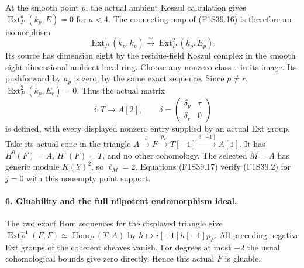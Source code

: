 At the smooth point $p$, the actual ambient
Koszul calculation gives
$\operatorname{Ext}^a_P(k_p,E)=0$ for $a<4$.
The connecting map of (F1S39.16) is therefore
an isomorphism
\[
 \operatorname{Ext}^1_P(k_p,k_p)
       \xrightarrow{\sim}\operatorname{Ext}^2_P(k_p,E_p).
 \tag{F1S39.19}
\]
Its source has dimension eight by the
residue-field Koszul complex in the smooth
eight-dimensional ambient local ring.
Choose any nonzero class $\tau$ in its image.
Its pushforward by $a_p$ is zero, by the same
exact sequence. Since $p\ne r$,
$\operatorname{Ext}^2_P(k_p,E_r)=0$.
Thus the actual matrix
\[
 \delta:T\longrightarrow A[2],\qquad
 \delta=\begin{pmatrix}\delta_p&\tau\\
                         \delta_r&0\end{pmatrix}
 \tag{F1S39.20}
\]
is defined, with every displayed nonzero
entry supplied by an actual Ext group.
Take its actual cone in the triangle
$A\xrightarrow{i}F\xrightarrow{p_F}T[-1]
\xrightarrow{\delta[-1]}A[1]$.
It has $H^0(F)=A$, $H^1(F)=T$, and no
other cohomology. The selected $M=A$
has generic module $K(Y)^2$, so $\ell_M=2$.
Equations (F1S39.17) verify (F1S39.2)
for $j=0$ with this nonempty point support.

\paragraph{6. Gluability and the full nilpotent endomorphism ideal.}
The two exact Hom sequences for the displayed
triangle give
$\operatorname{Ext}^{-1}_P(F,F)
\simeq\operatorname{Hom}_P(T,A)$ by
$h\mapsto i[-1]h[-1]p_F$.
All preceding negative Ext groups of the
coherent sheaves vanish. For degrees at most
$-2$ the usual cohomological bounds give zero
directly. Hence this actual $F$ is gluable.

